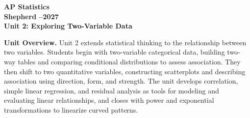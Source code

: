 \documentclass[10pt]{article}
\begin{document}
\vspace{-1.3in}

\begin{center}
  {\color{white}\bfseries\fontsize{28}{34}\selectfont AP Statistics}\\[8pt]
  {\color{goldacc}\bfseries\Large Shepherd --2027}\\[14pt]
  {\color{white}\bfseries\LARGE Unit 2: Exploring Two-Variable Data}\\[4pt]
\end{center}

\vspace{0.30in}

\begin{tcolorbox}[colback=sky,colframe=navy,boxrule=0.9pt,arc=2mm,
    left=4mm,right=4mm,top=3mm,bottom=3mm]
  \textbf{Unit Overview.}\quad
  Unit 2 extends statistical thinking to the relationship between two variables.
  Students begin with two-variable categorical data, building two-way tables and
  comparing conditional distributions to assess association. They then shift to two
  quantitative variables, constructing scatterplots and describing association using
  direction, form, and strength. The unit develops correlation, simple linear
  regression, and residual analysis as tools for modeling and evaluating linear
  relationships, and closes with power and exponential transformations to linearize
  curved patterns.
\end{tcolorbox}

\vspace{0.22in}
\end{document}
